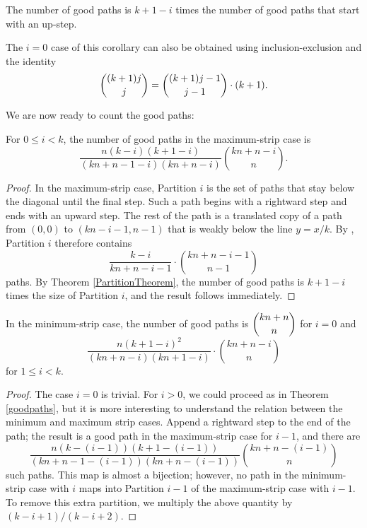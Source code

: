 \documentclass[10pt]{article}
\newcommand{\eqn}[1]{\begin{equation*} #1 \end{equation*}}
\begin{document}
\begin{corollary}
The number of good paths is $k+1-i$ times the number of good paths that start with an up-step.
\end{corollary}
\begin{remark}
The $i=0$ case of this corollary can also be obtained using inclusion-exclusion and the identity $$\dbinom{(k+1)j}{j}=\dbinom{(k+1)j-1}{j-1}\cdot(k+1).$$
\end{remark}

We are now ready to count the good paths:

\begin{theorem} \label{goodpaths}
For $0 \leq i < k$, the number of good paths in the maximum-strip case is $$\displaystyle \frac{n(k-i)(k+1-i)}{(kn+n-1-i)(kn+n-i)} \binom{kn+n-i}{n}.$$
\end{theorem}
\begin{proof}
In the maximum-strip case, Partition $i$ is the set of paths that stay below the diagonal until the final step.  Such a path begins with a rightward step and ends with an upward step.  The rest of the path is a translated copy of a path from $(0,0)$ to $(kn-i-1,n-1)$ that is weakly below the line $y=x/k$.  By \cite[Thm. 10.4.5]{encylatt}, Partition $i$ therefore contains
\eqn{\frac{k-i}{kn+n-i-1} \cdot \binom{kn+n-i-1}{n-1}}
paths.  By Theorem \ref{PartitionTheorem}, the number of good paths is $k+1-i$ times the size of Partition $i$, and the result follows immediately.
\end{proof}
\begin{corollary} \label{goodpathsminimum}
In the minimum-strip case, the number of good paths is $\dbinom{kn+n}{n}$ for $i=0$ and
\eqn{\frac{n(k+1-i)^2  }{(kn+n-i) (kn+1-i)} \cdot \binom{kn+n-i}{n}}
for $1 \leq i < k$.
\end{corollary}

\begin{proof}
The case $i=0$ is trivial.  For $i > 0$, we could proceed as in Theorem \ref{goodpaths}, but it is more interesting to understand the relation between the minimum and maximum strip cases. Append a rightward step to the end of the path; the result is a good path in the maximum-strip case for $i-1$, and there are 
\eqn{\frac{n(k-(i-1))(k+1-(i-1))}{(kn+n-1-(i-1))(kn+n-(i-1))} \binom{kn+n-(i-1)}{n}}
such paths. This map is almost a bijection; however, no path in the minimum-strip case with $i$ maps into Partition $i-1$ of the maximum-strip case with $i-1$. To remove this extra partition, we multiply the above quantity by $(k-i+1)/(k-i+2)$.
\end{proof}
\end{document}
